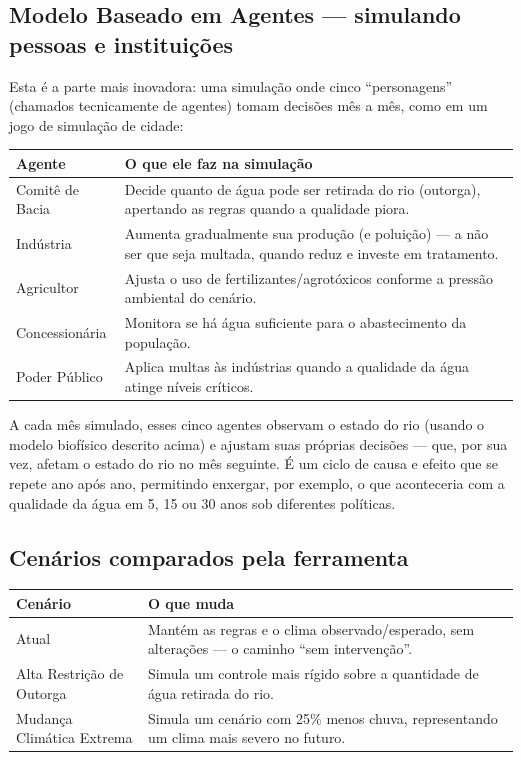 \documentclass[11pt,a4paper]{article}
\begin{document}
\subsection{Modelo Baseado em Agentes — simulando pessoas e instituições}

Esta é a parte mais inovadora: uma simulação onde cinco ``personagens'' (chamados tecnicamente de agentes) tomam decisões mês a mês, como em um jogo de simulação de cidade:

\begin{center}
\begin{longtable}{p{4cm}p{10.5cm}}
\toprule
\textbf{Agente} & \textbf{O que ele faz na simulação} \\
\midrule
\endhead
Comitê de Bacia & Decide quanto de água pode ser retirada do rio (outorga), apertando as regras quando a qualidade piora. \\
Indústria & Aumenta gradualmente sua produção (e poluição) — a não ser que seja multada, quando reduz e investe em tratamento. \\
Agricultor & Ajusta o uso de fertilizantes/agrotóxicos conforme a pressão ambiental do cenário. \\
Concessionária & Monitora se há água suficiente para o abastecimento da população. \\
Poder Público & Aplica multas às indústrias quando a qualidade da água atinge níveis críticos. \\
\bottomrule
\end{longtable}
\end{center}

A cada mês simulado, esses cinco agentes observam o estado do rio (usando o modelo biofísico descrito acima) e ajustam suas próprias decisões — que, por sua vez, afetam o estado do rio no mês seguinte. É um ciclo de causa e efeito que se repete ano após ano, permitindo enxergar, por exemplo, o que aconteceria com a qualidade da água em 5, 15 ou 30 anos sob diferentes políticas.

\subsection{Cenários comparados pela ferramenta}

\begin{center}
\begin{longtable}{p{4cm}p{10.5cm}}
\toprule
\textbf{Cenário} & \textbf{O que muda} \\
\midrule
\endhead
Atual & Mantém as regras e o clima observado/esperado, sem alterações — o caminho ``sem intervenção''. \\
Alta Restrição de Outorga & Simula um controle mais rígido sobre a quantidade de água retirada do rio. \\
Mudança Climática Extrema & Simula um cenário com 25\% menos chuva, representando um clima mais severo no futuro. \\
\bottomrule
\end{longtable}
\end{center}
\end{document}
